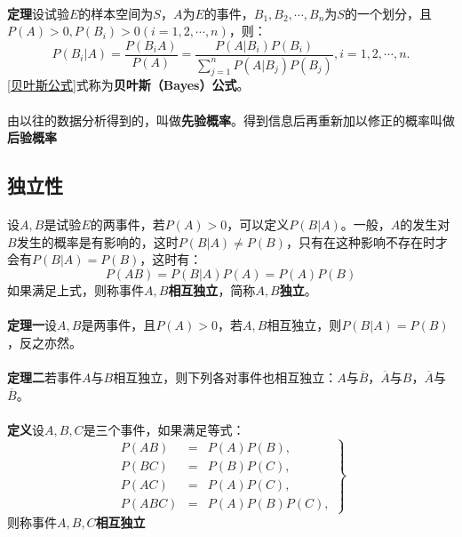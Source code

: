 \paragraph{}
\textbf{定理\;}设试验$E$的样本空间为$S$，$A$为$E$的事件，$B_1,B_2,\cdots,B_n$为$S$的一个划分，且$P(A)>0, P(B_i)>0(i=1,2,\cdots,n)$，则：
\begin{equation}
  \label{贝叶斯公式}
  P(B_i |A) = \frac{P(B_iA)}{P(A)} = \frac{P(A|B_i)P(B_i)}{\displaystyle \sum_{j=1}^n P(A|B_j)P(B_j)}, i = 1,2,\cdots,n.
\end{equation}
\eqref{贝叶斯公式}式称为\textbf{贝叶斯（Bayes）公式}。

\paragraph{}
由以往的数据分析得到的，叫做\textbf{先验概率}。得到信息后再重新加以修正的概率叫做\textbf{后验概率}

\subsection{独立性}
\paragraph{}
设$A,B$是试验$E$的两事件，若$P(A)>0$，可以定义$P(B|A)$。一般，$A$的发生对$B$发生的概率是有影响的，这时$P(B|A) \neq P(B)$，只有在这种影响不存在时才会有$P(B|A)=P(B)$，这时有：
\begin{equation}
  P(AB) = P(B|A)P(A) = P(A)P(B)
\end{equation}
如果满足上式，则称事件$A,B$\textbf{相互独立}，简称$A,B$\textbf{独立}。

\paragraph{}
\textbf{定理一\;}设$A,B$是两事件，且$P(A)>0$，若$A,B$相互独立，则$P(B|A)=P(B)$，反之亦然。

\paragraph{}
\textbf{定理二\;}若事件$A$与$B$相互独立，则下列各对事件也相互独立：$A$与$\overline{B}$，$\overline{A}$与$B$，$\overline{A}$与$\overline{B}$。

\paragraph{}
\textbf{定义\;}设$A,B,C$是三个事件，如果满足等式：
\begin{equation}
  \left. \begin{array}{rcl}
    P(AB) & = & P(A)P(B), \\
    P(BC) & = & P(B)P(C), \\
    P(AC) & = & P(A)P(C), \\
    P(ABC) & = & P(A)P(B)P(C),
  \end{array} \right\}
\end{equation}
则称事件$A,B,C$\textbf{相互独立}

